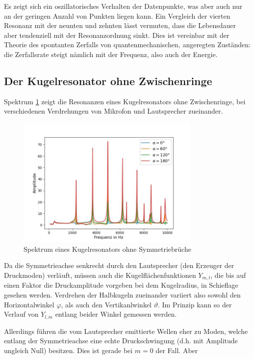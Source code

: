\documentclass[../main.tex]{subfiles}
\begin{document}
    Es zeigt sich ein oszillatorisches Verhalten der Datenpunkte, was aber auch nur an der geringen Anzahl von Punkten liegen kann. Ein Vergleich der vierten Resonanz mit der neunten und zehnten lässt vermuten, dass die Lebensdauer aber tendenziell mit der Resonanzordnung sinkt. Dies ist vereinbar mit der Theorie des spontanten Zerfalls von quantenmechanischen, angeregten Zuständen: die Zerfallsrate steigt nämlich mit der Frequenz, also auch der Energie.

\subsection{Der Kugelresonator ohne Zwischenringe}     
    Spektrum \ref{fig:II_f_Spektren} zeigt die Resonanzen eines Kugelresonators ohne Zwischenringe, bei verschiedenen Verdrehungen von Mikrofon und Lautsprecher zueinander.
    
    \begin{figure}[H]
        \centering
        \includegraphics[width=0.8\textwidth]{Bilddateien/Auswertung/II_f_Spektren.jpg}
        \caption{Spektrum eines Kugelresonators ohne Symmetriebrüche}
        \label{fig:II_f_Spektren}
    \end{figure}

    Da die Symmetrieachse senkrecht durch den Lautsprecher (den Erzeuger der Druckmoden) verläuft, müssen auch die Kugelflächenfunktionen $Y_{m,l}$, die bis auf einen Faktor die Druckamplitude vorgeben bei dem Kugelradius, in Schieflage gesehen werden. Verdrehen der Halbkugeln zueinander variiert also sowohl den Horizontalwinkel $\varphi$, als auch den Vertikanlwinkel $\vartheta$. Im Prinzip kann so der Verlauf von $Y_{l,m}$ entlang beider Winkel gemessen werden.

    Allerdings führen die vom Lautsprecher emittierte Wellen eher zu Moden, welche entlang der Symmetrieachse eine echte Druckschwingung (d.h. mit Amplitude ungleich Null) besitzen. Dies ist gerade bei $m=0$ der Fall. Aber
\end{document}
